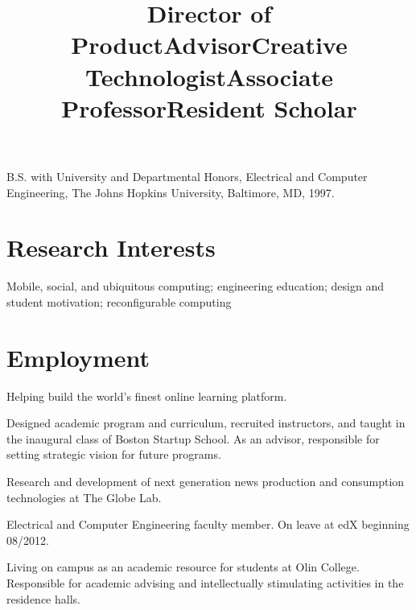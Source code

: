 \documentclass[line]{res}
\begin{document}
\begin{resume}
	B.S. with University and Departmental Honors, Electrical and Computer Engineering, The Johns Hopkins University, Baltimore, MD, 1997.
	
	\section{\sc Research Interests}
	
	Mobile, social, and ubiquitous computing; engineering education; design and student motivation; reconfigurable computing
	
	\section{\sc Employment}

	\title{Director of Product} 
	 
	\begin{position}
		Helping build the world's finest online learning platform.
	\end{position}
	
	\title{Advisor} 
	 
	\begin{position}
		Designed academic program and curriculum, recruited instructors, and taught in the inaugural class of Boston Startup School. As an advisor, responsible for setting strategic vision for future programs.
	\end{position}
	
	\title{Creative Technologist} 
	  
	\begin{position}
		Research and development of next generation news production and consumption
    technologies at The Globe Lab.
	\end{position}
	
	\title{Associate Professor} 
	  
	\begin{position}
		Electrical and Computer Engineering faculty member. On leave at edX beginning 08/2012.
	\end{position}
	
	\title{Resident Scholar} 
	  
	\begin{position}
		Living on campus as an academic resource for students at Olin College. Responsible for academic advising and intellectually stimulating activities in the residence halls. 
	\end{position}
	

\end{resume}
\end{document}

